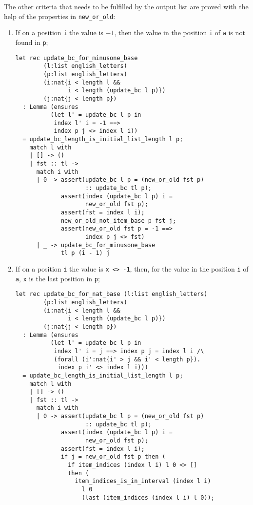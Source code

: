The other criteria that needs to be fulfilled by the output list are proved with the help of the properties in \texttt{new\_or\_old}:
\begin{enumerate}
\item If on a position \texttt{i} the value is \(-1\), then the value in the position \texttt{i} of \texttt{a} is not found in \texttt{p};
\begin{verbatim}
let rec update_bc_for_minusone_base 
        (l:list english_letters)
        (p:list english_letters)
        (i:nat{i < length l && 
               i < length (update_bc l p)})
        (j:nat{j < length p})
  : Lemma (ensures
          (let l' = update_bc l p in
           index l' i = -1 ==>
           index p j <> index l i))
  = update_bc_length_is_initial_list_length l p;
    match l with 
    | [] -> ()
    | fst :: tl -> 
      match i with 
      | 0 -> assert(update_bc l p = (new_or_old fst p)
                    :: update_bc tl p);
             assert(index (update_bc l p) i = 
                    new_or_old fst p);
             assert(fst = index l i);
             new_or_old_not_item_base p fst j;
             assert(new_or_old fst p = -1 ==>
                    index p j <> fst)
      | _ -> update_bc_for_minusone_base 
             tl p (i - 1) j
\end{verbatim}
\item If on a position \texttt{i} the value is \texttt{x <> -1}, then, for the value in the position \texttt{i} of \texttt{a}, \texttt{x} is the last position in \texttt{p};
\begin{verbatim}
let rec update_bc_for_nat_base (l:list english_letters)
        (p:list english_letters)
        (i:nat{i < length l &&
               i < length (update_bc l p)})
        (j:nat{j < length p})
  : Lemma (ensures 
          (let l' = update_bc l p in
           index l' i = j ==> index p j = index l i /\
           (forall (i':nat{i' > j && i' < length p}).
            index p i' <> index l i)))
  = update_bc_length_is_initial_list_length l p;
    match l with 
    | [] -> ()
    | fst :: tl ->
      match i with 
      | 0 -> assert(update_bc l p = (new_or_old fst p)
                    :: update_bc tl p);
             assert(index (update_bc l p) i =
                    new_or_old fst p);
             assert(fst = index l i);
             if j = new_or_old fst p then (
               if item_indices (index l i) l 0 <> [] 
               then (
                 item_indices_is_in_interval (index l i)
                   l 0
                   (last (item_indices (index l i) l 0));

\end{verbatim}
\end{enumerate}
